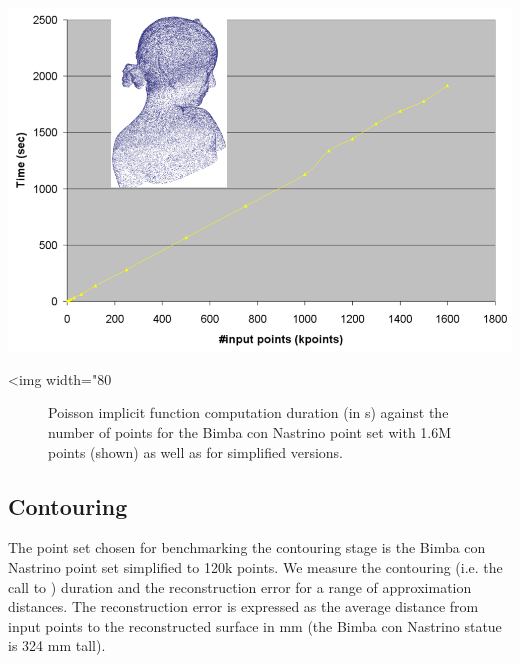 \begin{center}
    \begin{ccTexOnly}
        \includegraphics[width=1.0\textwidth]{Surface_reconstruction_points_3/poisson_bench}
    \end{ccTexOnly}
    \begin{ccHtmlOnly}
        <img width="80%
    \end{ccHtmlOnly}
    \begin{figure}[h]
        \caption{Poisson implicit function computation duration (in s)
                 against the number of points  for the Bimba con Nastrino
                 point set with 1.6M points (shown)
                 as well as for simplified versions.}
        \label{Surface_reconstruction_points_3-fig-poisson_bench}
    \end{figure}
\end{center}



\subsection{Contouring}

The point set chosen for benchmarking the contouring stage is the Bimba con Nastrino point set simplified to 120k points. We measure the contouring (i.e. the call to ) duration and the reconstruction error for a range of approximation distances.
The reconstruction error is expressed as the average distance from input points to the reconstructed surface in mm (the Bimba con Nastrino statue is 324 mm tall).

